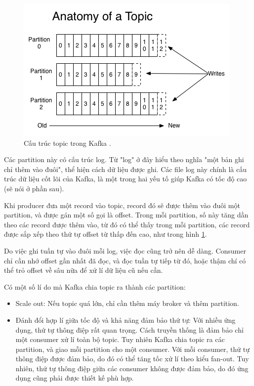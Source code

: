 \documentclass{article}
\begin{document}
\begin{figure}[H]
    \includegraphics[scale=0.5]{log_anatomy.png}
    \centering
    \caption{Cấu trúc topic trong Kafka \cite{kafka_intro}.}
    \label{log_anatomy}
\end{figure}

Các partition này có cấu trúc log. Từ "log" ở đây hiểu theo nghĩa "một bản ghi
chỉ thêm vào đuôi", thể hiện cách dữ liệu được ghi. Các file log này chính là
cấu trúc dữ liệu cốt lõi của Kafka, là một trong hai yếu tố giúp Kafka có tốc độ
cao (sẽ nói ở phần sau).

Khi producer đưa một record vào topic, record đó sẽ được thêm vào đuôi một
partition, và được gán một số gọi là offset. Trong mỗi partition, số này tăng
dần theo các record được thêm vào, từ đó có thể thấy trong mỗi partition, các
record được sắp xếp theo thứ tự offset từ thấp đến cao, như trong hình
\ref{log_anatomy}.

Do việc ghi tuần tự vào đuôi mỗi log, việc đọc cũng trở nên dễ dàng. Consumer
chỉ cần nhớ offset gần nhất đã đọc, và đọc tuần tự tiếp từ đó, hoặc thậm chí có
thể trỏ offset về sâu nữa để xử lí dữ liệu cũ nếu cần.

Có một số lí do mà Kafka chia topic ra thành các partition:

\begin{itemize}
    \item Scale out: Nếu topic quá lớn, chỉ cần thêm máy broker và thêm
        partition.
    \item Đánh đổi hợp lí giữa tốc độ và khả năng đảm bảo thứ tự: Với nhiều ứng
        dụng, thứ tự thông điệp rất quan trọng. Cách truyền thống là đảm bảo chỉ
        một consumer xử lí toàn bộ topic. Tuy nhiên Kafka chia topic ra các
        partition, và giao mỗi partition cho một consumer. Với mỗi consumer, thứ
        tự thông điệp được đảm bảo, do đó có thể tăng tốc xử lí theo kiểu
        fan-out. Tuy nhiên, thứ tự thông điệp giữa các consumer không được đảm
        bảo, do đó ứng dụng cũng phải được thiết kế phù hợp.
\end{itemize}
\end{document}
